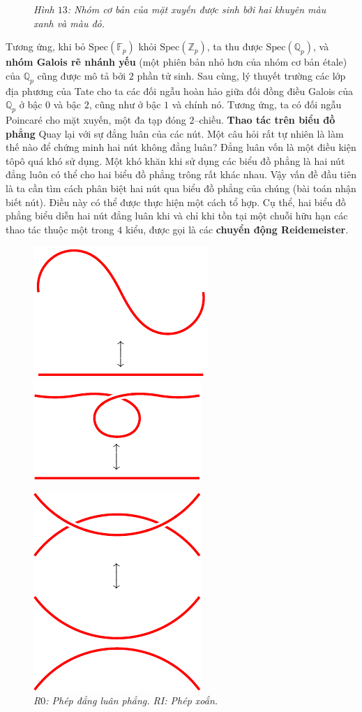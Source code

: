 \begin{multicols}{2}
\begin{figure}[H]
		\caption{\small\textit{\color{duongvaotoanhoc}Hình $13$: Nhóm cơ bản của mặt xuyến được sinh bởi hai khuyên màu xanh và màu đỏ.}}
		\vspace*{-5pt}
	\end{figure}
	Tương ứng, khi bỏ $\text{Spec}(\mathbb{F}_p)$ khỏi $\text{Spec}(\mathbb{Z}_p)$, ta thu được $\text{Spec}(\mathbb{Q}_p)$, và {\bf\color{duongvaotoanhoc} nhóm Galois rẽ nhánh yếu} (một phiên bản nhỏ hơn của nhóm cơ bản étale) của $\mathbb{Q}_p$ cũng được mô tả bởi $2$ phần tử sinh. Sau cùng, lý thuyết trường các lớp địa phương của Tate cho ta các đối ngẫu hoàn hảo giữa đối đồng điều Galois của  $\mathbb{Q}_p$ ở bậc $0$ và bậc $2$, cũng như ở bậc $1$ và chính nó. Tương ứng, ta có đối ngẫu Poincaré cho mặt xuyến, một đa tạp đóng $2$--chiều.
	\vskip 0.1cm
	\textbf{\color{duongvaotoanhoc}Thao tác trên biểu đồ phẳng}
	\vskip 0.1cm
	Quay lại với sự đẳng luân của các nút. Một câu hỏi rất tự nhiên là làm thế nào để chứng minh hai nút không đẳng luân? Đẳng luân vốn là một điều kiện tôpô quá khó sử dụng. Một khó khăn khi sử dụng các biểu đồ phẳng là hai nút đẳng luôn có thể cho hai biểu đồ phẳng trông rất khác nhau. Vậy vấn đề đầu tiên là ta cần tìm cách phân biệt hai nút qua biểu đồ phẳng của chúng (bài toán nhận biết nút). Điều này có thể được thực hiện một cách tổ hợp. Cụ thể, hai biểu đồ phẳng biểu diễn hai nút đẳng luân khi và chỉ khi tồn tại một chuỗi hữu hạn các thao tác thuộc một trong $4$ kiểu, được gọi là các {\bf\color{duongvaotoanhoc} chuyển động Reidemeister}.
	\begin{figure}[H]
		\vspace*{-10pt}
		\centering
		\captionsetup{labelformat= empty, justification=centering}
		\includegraphics[width= 0.3\linewidth]{R0.pdf}\quad
		\includegraphics[width= 0.3\linewidth]{R1.pdf}
		\caption{\small\textit{\color{duongvaotoanhoc}R$0$: Phép đẳng luân phẳng.\hspace*{20pt}  RI: Phép xoắn.}}
		\includegraphics[width= 0.3\linewidth]{R2.pdf}\quad

\end{figure}
\end{multicols}
